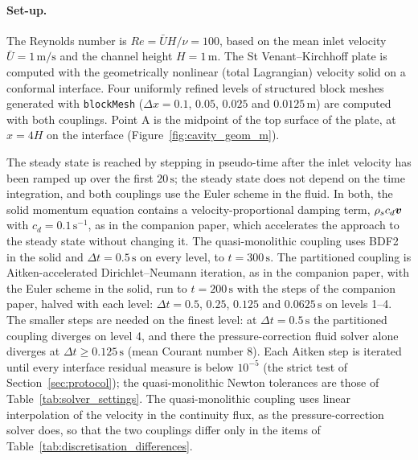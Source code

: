 \paragraph{Set-up.}
The Reynolds number is $Re = \bar{U}H/\nu = 100$, based on the mean inlet velocity $\bar{U} = 1\,\mathrm{m/s}$ and the channel height $H = 1\,\mathrm{m}$.
The St Venant--Kirchhoff plate is computed with the geometrically nonlinear (total Lagrangian) velocity solid on a conformal interface.
Four uniformly refined levels of structured block meshes generated with \texttt{blockMesh} ($\Delta x = 0.1$, $0.05$, $0.025$ and $0.0125\,\mathrm{m}$) are computed with both couplings.
Point A is the midpoint of the top surface of the plate, at $x = 4H$ on the interface (Figure~\ref{fig:cavity_geom_m}).

The steady state is reached by stepping in pseudo-time after the inlet velocity has been ramped up over the first $20\,\mathrm{s}$; the steady state does not depend on the time integration, and both couplings use the Euler scheme in the fluid.
In both, the solid momentum equation contains a velocity-proportional damping term, $\rho_s c_d \boldsymbol{v}$ with $c_d = 0.1\,\mathrm{s^{-1}}$, as in the companion paper, which accelerates the approach to the steady state without changing it.
The quasi-monolithic coupling uses BDF2 in the solid and $\Delta t = 0.5\,\mathrm{s}$ on every level, to $t = 300\,\mathrm{s}$.
The partitioned coupling is Aitken-accelerated Dirichlet--Neumann iteration, as in the companion paper, with the Euler scheme in the solid, run to $t = 200\,\mathrm{s}$ with the steps of the companion paper, halved with each level: $\Delta t = 0.5$, $0.25$, $0.125$ and $0.0625\,\mathrm{s}$ on levels 1--4.
The smaller steps are needed on the finest level: at $\Delta t = 0.5\,\mathrm{s}$ the partitioned coupling diverges on level 4, and there the pressure-correction fluid solver alone diverges at $\Delta t \geq 0.125\,\mathrm{s}$ (mean Courant number 8).
Each Aitken step is iterated until every interface residual measure is below $10^{-5}$ (the strict test of Section~\ref{sec:protocol}); the quasi-monolithic Newton tolerances are those of Table~\ref{tab:solver_settings}.
The quasi-monolithic coupling uses linear interpolation of the velocity in the continuity flux, as the pressure-correction solver does, so that the two couplings differ only in the items of Table~\ref{tab:discretisation_differences}.

